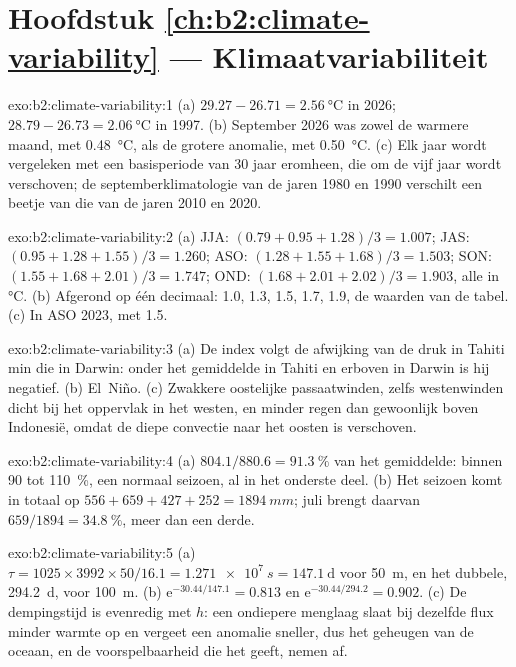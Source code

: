\section*{Hoofdstuk \ref{ch:b2:climate-variability} --- Klimaatvariabiliteit}

\begin{solution}{exo:b2:climate-variability:1}
(a) $29.27 - 26.71 = \qty{2.56}{\celsius}$ in 2026; $28.79 - 26.73 = \qty{2.06}{\celsius}$ in 1997.
(b) September 2026 was zowel de warmere maand, met \qty{0.48}{\celsius}, als de grotere anomalie, met
\qty{0.50}{\celsius}. (c) Elk jaar wordt vergeleken met een basisperiode van 30 jaar eromheen, die
om de vijf jaar wordt verschoven; de septemberklimatologie van de jaren 1980 en 1990 verschilt een beetje van die van
de jaren 2010 en 2020.
\end{solution}

\begin{solution}{exo:b2:climate-variability:2}
(a) JJA: $(0.79 + 0.95 + 1.28)/3 = 1.007$; JAS: $(0.95 + 1.28 + 1.55)/3 = 1.260$; ASO: $(1.28 +
1.55 + 1.68)/3 = 1.503$; SON: $(1.55 + 1.68 + 2.01)/3 = 1.747$; OND: $(1.68 + 2.01 + 2.02)/3 =
1.903$, alle in \unit{\celsius}. (b) Afgerond op één decimaal: 1.0, 1.3, 1.5, 1.7, 1.9, de waarden van
de tabel. (c) In ASO 2023, met 1.5.
\end{solution}

\begin{solution}{exo:b2:climate-variability:3}
(a) De index volgt de afwijking van de druk in Tahiti min die in Darwin: onder het gemiddelde
in Tahiti en erboven in Darwin is hij negatief. (b) El~Niño. (c) Zwakkere oostelijke passaatwinden, zelfs
westenwinden dicht bij het oppervlak in het westen, en minder regen dan gewoonlijk boven Indonesië, omdat de
diepe convectie naar het oosten is verschoven.
\end{solution}

\begin{solution}{exo:b2:climate-variability:4}
(a) $804.1/880.6 = \qty{91.3}{\percent}$ van het gemiddelde: binnen 90 tot \qty{110}{\percent}, een
normaal seizoen, al in het onderste deel. (b) Het seizoen komt in totaal op $556 + 659 + 427 + 252 =
\qty{1894}{mm}$; juli brengt daarvan $659/1894 = \qty{34.8}{\percent}$, meer dan een derde.
\end{solution}

\begin{solution}{exo:b2:climate-variability:5}
(a) $\tau = 1025 \times 3992 \times 50/16.1 = \qty{1.271e7}{s} = \qty{147.1}{\day}$ voor
\qty{50}{m}, en het dubbele, \qty{294.2}{\day}, voor \qty{100}{m}. (b) $\mathrm{e}^{-30.44/147.1} =
0.813$ en $\mathrm{e}^{-30.44/294.2} = 0.902$. (c) De dempingstijd is evenredig met $h$: een
ondiepere menglaag slaat bij dezelfde flux minder warmte op en vergeet een anomalie sneller, dus het
geheugen van de oceaan, en de voorspelbaarheid die het geeft, nemen af.
\end{solution}

